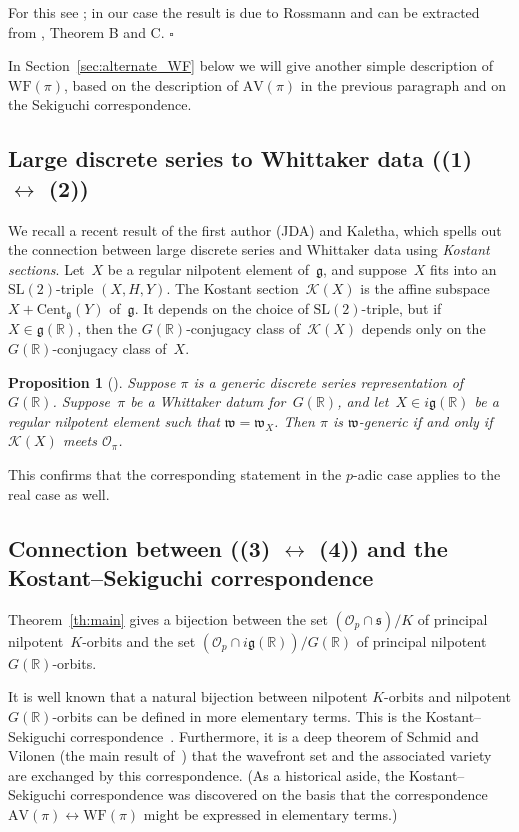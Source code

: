 \documentclass[10pt,leqno]{article}
\newtheorem{proposition}[equation]{Proposition}
\newcommand{\qed}{\hfill $\square$ \medskip}
\renewcommand{\O}{\mathcal O}
\newcommand{\R}{\mathbb R}
\newcommand{\g}{\mathfrak g}
\newcommand{\SL}{\text{SL}}
\newcommand{\s}{\mathfrak s}
\newcommand{\w}{\mathfrak w}
\newcommand{\AV}{\mathrm{AV}}
\newcommand{\WF}{\mathrm{WF}}
\newcommand{\Op}{\O_p}
\newcommand{\Kostant}[1]{\mathcal{K}(#1)}
\begin{document}
For this see \cite{HarrisHeOlafsson}; in our case the result is due to Rossmann and can be extracted from \cite{RossmannPicard}, Theorem B and C. \qed

In Section~\ref{sec:alternate_WF} below we will  give another simple description of~$\WF(\pi)$, based on the description of $\AV(\pi)$ in the previous paragraph and on the Sekiguchi correspondence. 

\subsection{Large discrete series to Whittaker data ((1) $\leftrightarrow$ (2))}


We recall a recent result of the first author (JDA) and Kaletha, which spells out the connection between large discrete series and Whittaker data using  {\it Kostant sections}. Let~$X$ be a regular nilpotent element of~$\g$, and suppose~$X$ fits into an $\SL(2)$-triple $(X, H, Y)$. The Kostant section~$\Kostant{X}$ is the affine subspace $X + \mathrm{Cent}_{\g}(Y)$ of~$\g$. It depends on the choice of $\SL(2)$-triple, but if $X \in \g(\R)$, then the $G(\R)$-conjugacy class of~$\Kostant{X}$ depends only on the $G(\R)$-conjugacy class of~$X$. 


\begin{proposition}[\cite{adams_kaletha}]\label{JeffTasho_criterion}
Suppose $\pi$ is a generic discrete series representation of~$G(\R)$. Suppose~$\pi$ be a Whittaker datum for~$G(\R)$, and let~$X \in i\g(\R)$ be a regular nilpotent element such that $\w = \w_X$. 
Then $\pi$ is $\w$-generic if and only if $\Kostant{X}$ meets $\mathcal{O}_\pi$. 
\end{proposition}


This confirms that  the corresponding statement  in the $p$-adic case \cite{debacker_reeder_generic, kaletha_epipelagic}
applies to the real case as well.


\subsection{Connection between ((3) $\leftrightarrow$ (4)) and the Kostant--Sekiguchi correspondence } 

Theorem~\ref{th:main} gives a bijection between the set $(\Op \cap \s)/K$ of principal nilpotent~$K$-orbits and the set $(\Op \cap i\g(\R))/G(\R)$ of principal nilpotent~$G(\R)$-orbits. 

It is well known that a natural bijection between nilpotent $K$-orbits and nilpotent $G(\R)$-orbits can be defined in more elementary terms. This is the Kostant--Sekiguchi correspondence~\cite{sekiguchi}. Furthermore, it is a deep theorem of Schmid and Vilonen (the main result of~\cite{SV1}) that the wavefront set and the associated variety are exchanged by this correspondence. (As a historical aside, the Kostant--Sekiguchi correspondence was discovered on the basis that the correspondence $\AV(\pi) \leftrightarrow \WF(\pi)$ might be expressed in elementary terms.)
\end{document}
